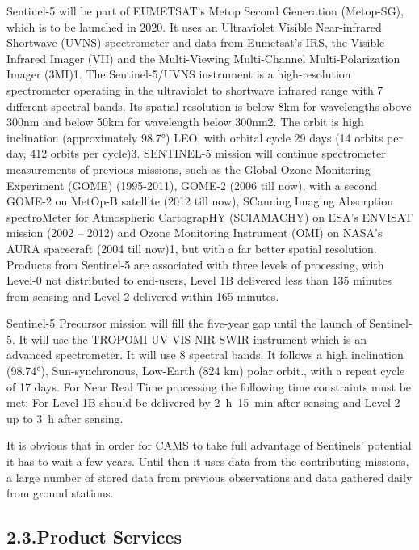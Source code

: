 \documentclass[9pt]{report}
\begin{document}
Sentinel-5 will be part of EUMETSAT's Metop Second Generation (Metop-SG), which is to be launched in 2020. It uses an Ultraviolet Visible Near-infrared Shortwave (UVNS) spectrometer and data from Eumetsat's IRS, the Visible Infrared Imager (VII) and the Multi-Viewing Multi-Channel Multi-Polarization Imager (3MI)1. The Sentinel-5/UVNS instrument is a high-resolution spectrometer operating in the ultraviolet to shortwave infrared range with 7 different spectral bands. Its spatial resolution is below 8km for wavelengths above 300nm and below 50km for wavelength below 300nm2. The orbit is high inclination (approximately 98.7°) LEO, with orbital cycle 29 days (14 orbits per day, 412 orbits per cycle)3. SENTINEL-5 mission will continue spectrometer measurements of previous missions, such as the Global Ozone Monitoring Experiment (GOME) (1995-2011), GOME-2 (2006 till now), with a second GOME-2 on MetOp-B satellite (2012 till now), SCanning Imaging Absorption spectroMeter for Atmospheric CartograpHY (SCIAMACHY) on ESA's ENVISAT mission (2002 – 2012) and Ozone Monitoring Instrument (OMI) on NASA's AURA spacecraft (2004 till now)1, but with a far better spatial resolution. Products from Sentinel-5 are associated with three levels of processing, with Level-0 not distributed to end-users, Level 1B delivered less than 135 minutes from sensing and Level-2 delivered within 165 minutes.%

Sentinel-5 Precursor mission will fill the five-year gap until the launch of Sentinel-5. It will use the TROPOMI UV-VIS-NIR-SWIR instrument which is an advanced spectrometer. It will use 8 spectral bands. It follows a high inclination (98.74°), Sun-synchronous, Low-Earth (824 km) polar orbit., with a repeat cycle of 17 days. For Near Real Time processing the following time constraints must be met: For Level-1B should be delivered by 2 h 15 min after sensing and Level-2 up to 3 h after sensing.%

It is obvious that in order for CAMS to take full advantage of Sentinels' potential it has to wait a few years. Until then it uses data from the contributing missions, a large number of stored data from previous observations and data gathered daily from ground stations.%

\subsection{2.3.\hspace*{0.5em}Product Services}\label{sec-product-services}%
\end{document}
